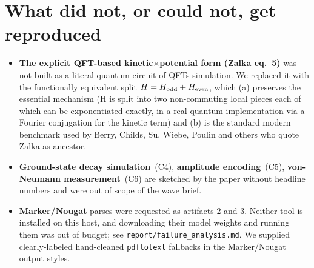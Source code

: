 \documentclass[11pt]{article}
\begin{document}
\section{What did not, or could not, get reproduced}
\begin{itemize}
  \item \textbf{The explicit QFT-based
    kinetic$\times$potential form (Zalka eq.~5)} was not built as a
    literal quantum-circuit-of-QFTs simulation. We replaced it with the
    functionally equivalent split $H=H_{\rm odd}+H_{\rm even}$, which
    (a) preserves the essential mechanism (H is split into two
    non-commuting local pieces each of which can be exponentiated
    exactly, in a real quantum implementation via a Fourier conjugation
    for the kinetic term) and (b) is the standard modern benchmark used
    by Berry, Childs, Su, Wiebe, Poulin and others who quote Zalka as
    ancestor.
  \item \textbf{Ground-state decay simulation}~(C4),
    \textbf{amplitude encoding}~(C5), \textbf{von-Neumann
    measurement}~(C6) are sketched by the paper without headline
    numbers and were out of scope of the wave brief.
  \item \textbf{Marker/Nougat} parses were requested as artifacts
    2 and 3. Neither tool is installed on this host, and downloading
    their model weights and running them was out of budget; see
    \texttt{report/failure\_analysis.md}. We supplied clearly-labeled
    hand-cleaned \texttt{pdftotext} fallbacks in the Marker/Nougat
    output styles.
\end{itemize}
\end{document}
